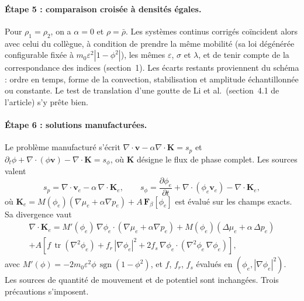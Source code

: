 \paragraph{Étape 5 : comparaison croisée à densités égales.} Pour $\rho_1=\rho_2$, on a $\alpha=0$ et $\rho=\bar{\rho}$. Les systèmes continus corrigés coïncident alors avec celui du collègue, à condition de prendre la même mobilité (sa loi dégénérée configurable fixée à $m_0\varepsilon^{2}|1-\phi^{2}|$), les mêmes $\varepsilon$, $\sigma$ et $\lambda$, et de tenir compte de la correspondance des indices (section~1). Les écarts restants proviennent du schéma : ordre en temps, forme de la convection, stabilisation et amplitude échantillonnée ou constante. Le test de translation d'une goutte de Li et al.\ (section~4.1 de l'article) s'y prête bien.

\paragraph{Étape 6 : solutions manufacturées.} Le problème manufacturé s'écrit $\nabla\cdot\mathbf{v} - \alpha\nabla\cdot\mathbf{K} = s_p$ et $\partial_t\phi + \nabla\cdot(\phi\mathbf{v}) - \nabla\cdot\mathbf{K} = s_\phi$, où $\mathbf{K}$ désigne le flux de phase complet. Les sources valent
\begin{equation}
  s_p = \nabla\cdot\mathbf{v}_{e} - \alpha\,\nabla\cdot\mathbf{K}_{e},
  \qquad
  s_\phi = \frac{\partial\phi_{e}}{\partial t} + \nabla\cdot\left(\phi_{e}\mathbf{v}_{e}\right) - \nabla\cdot\mathbf{K}_{e},
\end{equation}
où $\mathbf{K}_e = M(\phi_e)\left(\nabla\mu_e+\alpha\nabla p_e\right) + A\,\mathbf{F}_\beta[\phi_e]$ est évalué sur les champs exacts. Sa divergence vaut
\begin{multline}
  \nabla\cdot\mathbf{K}_{e}
  = M'(\phi_e)\,\nabla\phi_e\cdot\left(\nabla\mu_e+\alpha\nabla p_e\right)
  + M(\phi_e)\left(\Delta\mu_e + \alpha\,\Delta p_e\right)\\
  + A\left[f\,\operatorname{tr}\!\left(\nabla^{2}\phi_e\right) + f_r\,|\nabla\phi_e|^{2}
  + 2f_s\,\nabla\phi_e\cdot\left(\nabla^{2}\phi_e\,\nabla\phi_e\right)\right],
\end{multline}
avec $M'(\phi) = -2m_0\varepsilon^{2}\phi\,\operatorname{sgn}(1-\phi^{2})$, et $f$, $f_r$, $f_s$ évalués en $\left(\phi_e,|\nabla\phi_e|^{2}\right)$. Les sources de quantité de mouvement et de potentiel sont inchangées. Trois précautions s'imposent.
